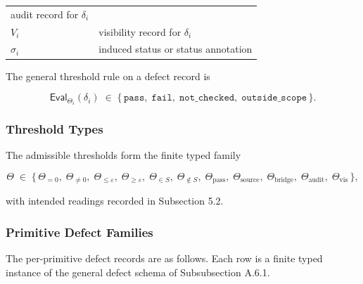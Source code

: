 \documentclass[11pt]{article}
\theoremstyle{definition}
\begin{document}
\begin{longtable}[]{@{}ll@{}}
\begin{minipage}[t]{0.73\columnwidth}
audit record for \(\delta_{i}\)\strut
\end{minipage}\tabularnewline
\begin{minipage}[t]{0.21\columnwidth}\raggedright
\(V_{i}\)\strut
\end{minipage} & \begin{minipage}[t]{0.73\columnwidth}\raggedright
visibility record for \(\delta_{i}\)\strut
\end{minipage}\tabularnewline
\begin{minipage}[t]{0.21\columnwidth}\raggedright
\(\sigma_{i}\)\strut
\end{minipage} & \begin{minipage}[t]{0.73\columnwidth}\raggedright
induced status or status annotation\strut
\end{minipage}\tabularnewline
\bottomrule
\end{longtable}

The general threshold rule on a defect record is

\[
\mathsf{Eval}_{\Theta_{i}}(\delta_{i})\;\in\;\{\,\texttt{pass},\;\texttt{fail},\;\texttt{not\_checked},\;\texttt{outside\_scope}\,\}.
\]

\subsubsection{Threshold Types}

The admissible thresholds form the finite typed family

\[
\Theta\;\in\;\{\,\Theta_{=0},\;\Theta_{\neq0},\;\Theta_{\le\varepsilon},\;\Theta_{\ge\varepsilon},\;\Theta_{\in S},\;\Theta_{\notin S},\;\Theta_{\mathrm{pass}},\;\Theta_{\mathrm{source}},\;\Theta_{\mathrm{bridge}},\;\Theta_{\mathrm{audit}},\;\Theta_{\mathrm{vis}}\,\},
\]

with intended readings recorded in Subsection 5.2.

\subsubsection{Primitive Defect Families}

The per-primitive defect records are as follows. Each row is a finite typed instance of the general defect schema of Subsubsection A.6.1.
\end{document}

